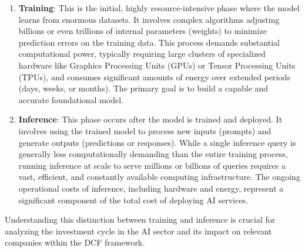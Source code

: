 \begin{enumerate}
    \item \textbf{Training}: This is the initial, highly resource-intensive phase where the model learns from enormous datasets. It involves complex algorithms adjusting billions or even trillions of internal parameters (weights) to minimize prediction errors on the training data. This process demands substantial computational power, typically requiring large clusters of specialized hardware like Graphics Processing Units (GPUs) or Tensor Processing Units (TPUs), and consumes significant amounts of energy over extended periods (days, weeks, or months). The primary goal is to build a capable and accurate foundational model.
    \item \textbf{Inference}: This phase occurs after the model is trained and deployed. It involves using the trained model to process new inputs (prompts) and generate outputs (predictions or responses). While a single inference query is generally less computationally demanding than the entire training process, running inference at scale to serve millions or billions of queries requires a vast, efficient, and constantly available computing infrastructure. The ongoing operational costs of inference, including hardware and energy, represent a significant component of the total cost of deploying AI services.
\end{enumerate}

Understanding this distinction between training and inference is crucial for analyzing the investment cycle in the AI sector and its impact on relevant companies within the DCF framework.

